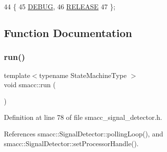 \begin{DoxyCode}
44 \{
45   \hyperlink{namespacesmacc_a3e4f79486ea6ea6342dd3c712d16a4f6adc30ec20708ef7b0f641ef78b7880a15}{DEBUG},
46   \hyperlink{namespacesmacc_a3e4f79486ea6ea6342dd3c712d16a4f6a7d649ef069df9885e382417c79f3d5cd}{RELEASE}
47 \};
\end{DoxyCode}


\subsection{Function Documentation}
\mbox{\label{namespacesmacc_a47ac3b8d2968b1ba4152afd64ab66bd0}} 
\subsubsection{\texorpdfstring{run()}{run()}}
{\footnotesize\ttfamily template$<$typename State\+Machine\+Type $>$ \\
void smacc\+::run (\begin{DoxyParamCaption}{ }\end{DoxyParamCaption})}



Definition at line 78 of file smacc\+\_\+signal\+\_\+detector.\+h.



References smacc\+::\+Signal\+Detector\+::polling\+Loop(), and smacc\+::\+Signal\+Detector\+::set\+Processor\+Handle().


